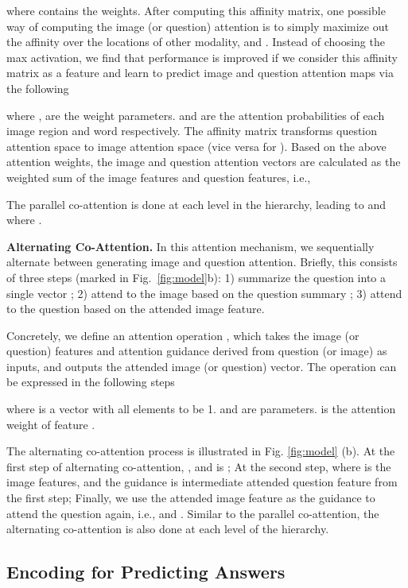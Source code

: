 \documentclass{article}
\begin{document}
where  contains the weights. After computing this affinity matrix, one possible way of computing the image (or question) attention is to simply maximize out the affinity over the locations of other modality, \ie  and . 
Instead of choosing the max activation, we find that performance is improved if we consider this affinity matrix as a feature and learn to predict image and question attention maps via the following


where ,  are the weight parameters.  and  are the attention probabilities of each image region  and word  respectively. The affinity matrix  transforms question attention space to image attention space (vice versa for ).
Based on the above attention weights, the image and question attention vectors are calculated as the weighted sum of the image features and question features, i.e.,

The parallel co-attention is done at each level in the hierarchy, leading to  and  where .


\textbf{Alternating Co-Attention.} In this attention mechanism, we sequentially alternate between generating image and question attention. Briefly, this consists of three steps (marked in Fig.~\ref{fig:model}b): 1) summarize the question into a single vector ; 2) attend to the image based on the question summary ; 3) attend to the question based on the attended image feature. 

Concretely, we define an attention operation , which takes the image (or question) features  and attention guidance  derived from question (or image) as inputs, and outputs the attended image (or question) vector. The operation can be expressed in the following steps

where  is a vector with all elements to be 1.  and  are parameters.  is the attention weight of feature . 

The alternating co-attention process is illustrated in Fig. \ref{fig:model} (b). At the first step of alternating co-attention, , and  is ; At the second step,  where  is the image features, and the guidance  is intermediate attended question feature  from the first step; Finally, we use the attended image feature  as the guidance to attend the question again, i.e.,  and . Similar to the parallel co-attention, the alternating co-attention is also done at each level of the hierarchy.
\subsection{Encoding for Predicting Answers}
\label{subsec:recursive}
\end{document}
